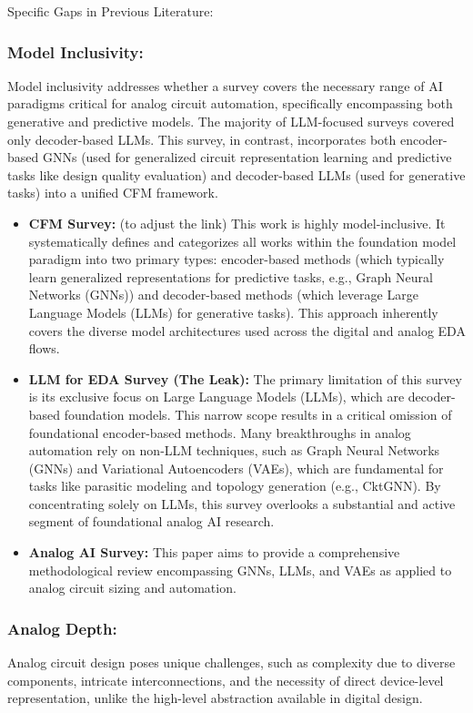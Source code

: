 \documentclass{ieeeaccess}
\begin{document}
Specific Gaps in Previous Literature:

\subsubsection{Model Inclusivity:} Model inclusivity addresses whether a survey covers the necessary range of AI paradigms critical for analog circuit automation, specifically encompassing both generative and predictive models.
The majority of LLM-focused surveys covered only decoder-based LLMs. This survey, in contrast, incorporates both encoder-based GNNs (used for generalized circuit representation learning and predictive tasks like design quality evaluation) and decoder-based LLMs (used for generative tasks) into a unified CFM framework.

\begin{itemize}
	\item \textbf{CFM Survey:} (to adjust the link) This work is highly model-inclusive. It systematically defines and categorizes all works within the foundation model paradigm into two primary types: encoder-based methods (which typically learn generalized representations for predictive tasks, e.g., Graph Neural Networks (GNNs)) and decoder-based methods (which leverage Large Language Models (LLMs) for generative tasks). This approach inherently covers the diverse model architectures used across the digital and analog EDA flows.

	\item \textbf{LLM for EDA Survey (The Leak):} The primary limitation of this survey is its exclusive focus on Large Language Models (LLMs), which are decoder-based foundation models. This narrow scope results in a critical omission of foundational encoder-based methods. Many breakthroughs in analog automation rely on non-LLM techniques, such as Graph Neural Networks (GNNs) and Variational Autoencoders (VAEs), which are fundamental for tasks like parasitic modeling and topology generation (e.g., CktGNN). By concentrating solely on LLMs, this survey overlooks a substantial and active segment of foundational analog AI research.

	\item \textbf{Analog AI Survey:} This paper aims to provide a comprehensive methodological review encompassing GNNs, LLMs, and VAEs as applied to analog circuit sizing and automation.
\end{itemize}

\subsubsection{Analog Depth:} Analog circuit design poses unique challenges, such as complexity due to diverse components, intricate interconnections, and the necessity of direct device-level representation, unlike the high-level abstraction available in digital design.
\end{document}
